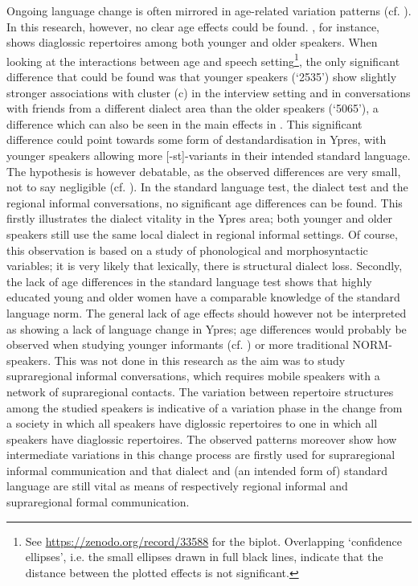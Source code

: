 \documentclass[output=paper]{LSP/langsci}
\begin{document}
Ongoing language change is often mirrored in age-related variation patterns (cf. \citealt{bailey_apparent_1991}). In this research, however, no clear age effects could be found. , for instance, shows diaglossic repertoires among both younger and older speakers. When looking at the interactions between age and speech setting\footnote{See \url{https://zenodo.org/record/33588} %
for the biplot. Overlapping ‘confidence ellipses’, i.e. the small ellipses drawn in full black lines, indicate that the distance between the plotted effects is not significant.}, the only significant difference that could be found was that younger speakers (‘2535’) show slightly stronger associations with cluster (c) in the interview setting and in conversations with friends from a different dialect area than the older speakers (‘5065’), a difference which can also be seen in the main effects in . This significant difference could point towards some form of destandardisation in Ypres, with younger speakers allowing more [-st]-variants in their intended standard language. The hypothesis is however debatable, as the observed differences are very small, not to say negligible (cf. ). In the standard language test, the dialect test and the regional informal conversations, no significant age differences can be found. This firstly illustrates the dialect vitality in the Ypres area; both younger and older speakers still use the same local dialect in regional informal settings. Of course, this observation is based on a study of phonological and morphosyntactic variables; it is very likely that lexically, there is structural dialect loss. Secondly, the lack of age differences in the standard language test shows that highly educated young and older women have a comparable knowledge of the standard language norm. The general lack of age effects should however not be interpreted as showing a lack of language change in Ypres; age differences would probably be observed when studying younger informants (cf. \citealt{soete_morfologische_2012}) or more traditional NORM-speakers. This was not done in this research as the aim was to study supraregional informal conversations, which requires mobile speakers with a network of supraregional contacts. The variation between repertoire structures among the studied speakers is indicative of a variation phase in the change from a society in which all speakers have diglossic repertoires to one in which all speakers have diaglossic repertoires. The observed patterns moreover show how intermediate variations in this change process are firstly used for supraregional informal communication and that dialect and (an intended form of) standard language are still vital as means of respectively regional informal and supraregional formal communication. 
\end{document}
